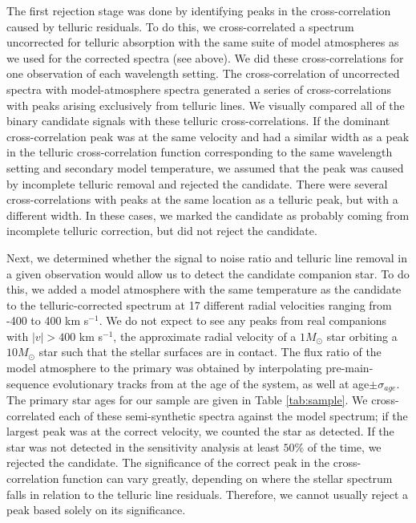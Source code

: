 \documentclass[11pt]{report}     %
\begin{document}
The first rejection stage was done by identifying peaks in the
cross-correlation caused by telluric residuals. To do this, we
cross-correlated a spectrum uncorrected for telluric absorption with
the same suite of model atmospheres as we used for the corrected
spectra (see above). We did these cross-correlations for one observation of each wavelength
setting. The cross-correlation of uncorrected spectra with model-atmosphere spectra generated a series of cross-correlations with peaks
arising exclusively from telluric lines. We visually compared all
of the binary candidate signals with these telluric
cross-correlations. If the dominant cross-correlation peak was at the
same velocity and had a similar width as a peak in the telluric
cross-correlation function corresponding to the same wavelength
setting and secondary model temperature, we assumed that the peak was caused by incomplete
telluric removal and rejected the candidate. There were several
cross-correlations with peaks at the same location as a telluric peak,
but with a different width. In these cases, we marked the candidate as
probably coming from incomplete telluric correction, but did not
reject the candidate.

Next, we determined whether the signal to noise ratio and telluric line removal in a given observation would allow us to detect the candidate companion star.
To do this, we added a model atmosphere with the
same temperature as the candidate to the telluric-corrected spectrum at 17 different radial
velocities ranging from -400 to 400 km s$^{-1}$. We do not expect to see any
peaks from real companions with $|v| > 400$ km s$^{-1}$, the approximate
radial velocity of a $1 M_{\odot}$ star orbiting a $10 M_{\odot}$ star
such that the stellar surfaces are in contact. The flux ratio of the model atmosphere to the primary was obtained by
interpolating pre-main-sequence evolutionary tracks from
\cite{Landin2008} at the age of the system, as well at age$\pm
\sigma_{age}$. The primary star ages for our sample are given in Table
\ref{tab:sample}. We cross-correlated each of these semi-synthetic
spectra against the model spectrum; if the largest
peak was at the correct velocity, we counted the star as
detected. If the star was not detected in the sensitivity
analysis at least $50\%$ of the time, we rejected the candidate.
The significance of the correct peak in the cross-correlation 
function can vary greatly, depending on where the stellar spectrum falls in 
relation to the telluric line residuals. Therefore, we cannot usually reject a peak
based solely on its significance.
\end{document}
